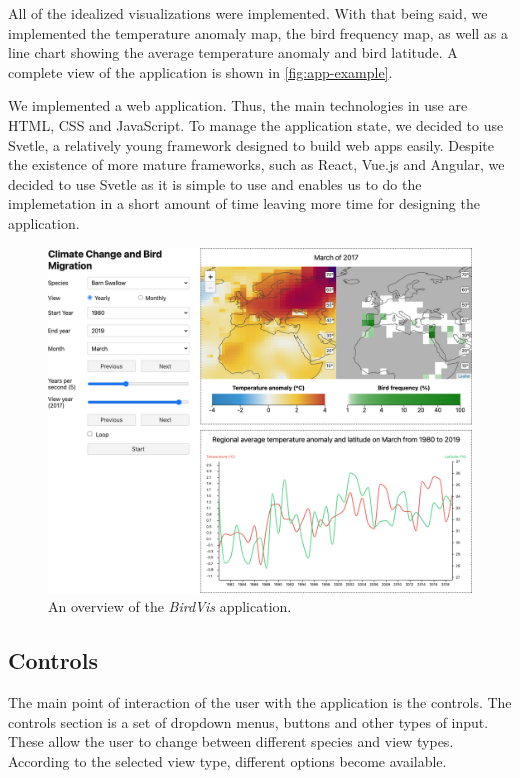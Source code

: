\documentclass[journal]{vgtc}                %
\begin{document}
All of the idealized visualizations were implemented. With that being said, we implemented the temperature anomaly map, the bird frequency map, as well as a line chart showing the average temperature anomaly and bird latitude. A complete view of the application is shown in \autoref{fig:app-example}.

We implemented a web application. Thus, the main technologies in use are HTML, CSS and JavaScript. To manage the application state, we decided to use Svetle\cite{svetle}, a relatively young framework designed to build web apps easily. Despite the existence of more mature frameworks, such as React, Vue.js and Angular, we decided to use Svetle as it is simple to use and enables us to do the implemetation in a short amount of time leaving more time for designing the application.

\begin{figure}[t]
  \centering
  \includegraphics[width=\linewidth]{app-example.png}
  \caption{An overview of the \emph{BirdVis} application.}
  \label{fig:app-example}
\end{figure}

\subsection{Controls}

The main point of interaction of the user with the application is the controls. The controls section is a set of dropdown menus, buttons and other types of input. These allow the user to change between different species and view types. According to the selected view type, different options become available.
\end{document}
